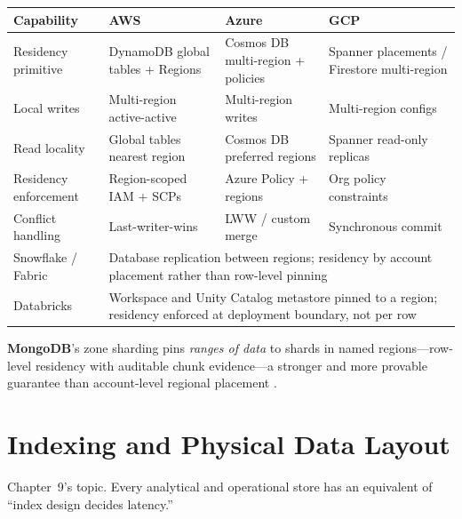 \begin{center}
\footnotesize
\begin{tabular}{@{}p{2.9cm}p{3.0cm}p{3.0cm}p{3.0cm}@{}}
\toprule
\textbf{Capability} & \textbf{AWS} & \textbf{Azure} & \textbf{GCP} \\
\midrule
Residency primitive & DynamoDB global tables + Regions & Cosmos DB multi-region + policies & Spanner placements / Firestore multi-region \\
Local writes & Multi-region active-active & Multi-region writes & Multi-region configs \\
Read locality & Global tables nearest region & Cosmos DB preferred regions & Spanner read-only replicas \\
Residency enforcement & Region-scoped IAM + SCPs & Azure Policy + regions & Org policy constraints \\
Conflict handling & Last-writer-wins & LWW / custom merge & Synchronous commit \\
\addlinespace
Snowflake / Fabric & \multicolumn{3}{l}{Database replication between regions; residency by account placement rather than row-level pinning} \\
Databricks & \multicolumn{3}{l}{Workspace and Unity Catalog metastore pinned to a region; residency enforced at deployment boundary, not per row} \\
\bottomrule
\end{tabular}
\end{center}

\noindent \textbf{MongoDB}'s zone sharding pins \emph{ranges of data} to shards in named
regions---row-level residency with auditable chunk evidence---a stronger and more provable
guarantee than account-level regional placement \cite{mongodbZoneShardingDocs,mongodbGlobalClustersDocs}.

\section{Indexing and Physical Data Layout}
%
Chapter~9's topic. Every analytical and operational store has an equivalent of ``index design
decides latency.''

